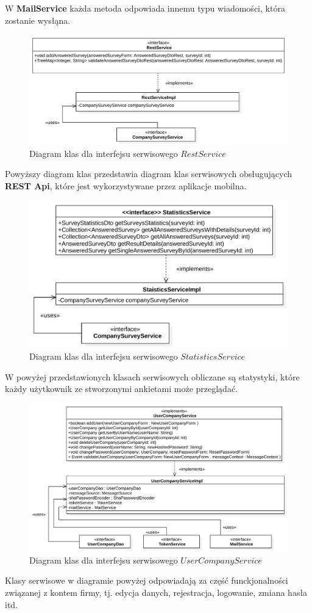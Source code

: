\documentclass[a4paper]{article}
\begin{document}
W \textbf{MailService} każda metoda odpowiada innemu typu  wiadomości, która zostanie wysłąna.
\begin{figure}[H]
  \centering
  \includegraphics[scale=0.6]{rest_service.pdf}
  \caption{Diagram klas dla interfejsu serwisowego $RestService$}
\end{figure}
Powyższy diagram klas przedstawia diagram klas serwisowych obsługujących \textbf{REST Api}, które jest wykorzystywane przez aplikacje mobilna.
\begin{figure}[H]
  \centering
  \includegraphics[scale=0.6]{statistics_service.pdf}
  \caption{Diagram klas dla interfejsu serwisowego $StatisticsService$}
\end{figure}
W powyżej przedstawionych klasach serwisowych obliczane są statystyki, które każdy użytkownik ze stworzonymi ankietami może przeglądać.
\begin{figure}[H]
  \centering
  \includegraphics[scale=0.6]{user_company_service.pdf}
  \caption{Diagram klas dla interfejsu serwisowego $UserCompanyService$}
\end{figure}
Klasy serwisowe w diagramie powyżej odpowiadają za część funckjonalności związanej z kontem firmy, tj. edycja danych, rejestracja, logowanie, zmiana hasła itd.
\end{document}
